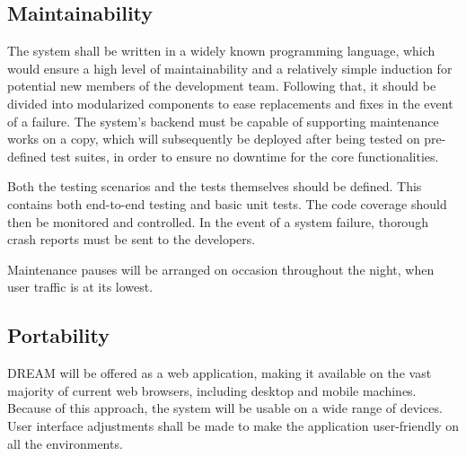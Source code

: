 \subsection{Maintainability}

The system shall be written in a widely known programming language, which would ensure a high level of maintainability and a relatively simple induction for potential new members of the development team. Following that, it should be divided into modularized components to ease replacements and fixes in the event of a failure. The system's backend must be capable of supporting maintenance works on a copy, which will subsequently be deployed after being tested on pre-defined test suites, in order to ensure no downtime for the core functionalities.

Both the testing scenarios and the tests themselves should be defined. This contains both end-to-end testing and basic unit tests. The code coverage should then be monitored and controlled. In the event of a system failure, thorough crash reports must be sent to the developers.

Maintenance pauses will be arranged on occasion throughout the night, when user traffic is at its lowest.

\subsection{Portability}

DREAM will be offered as a web application, making it available on the vast majority of current web browsers, including desktop and mobile machines. Because of this approach, the system will be usable on a wide range of devices. User interface adjustments shall be made to make the application user-friendly on all the environments.
